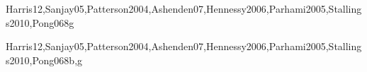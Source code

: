 \begin{syllabus}
\begin{unit}{\ARMachinelevelrepresentationofdata}{}{Harris12,Sanjay05,Patterson2004,Ashenden07,Hennessy2006,Parhami2005,Stallings2010,Pong06}{8}{g}
\begin{learningoutcomes}
\item \ARMachinelevelrepresentationofdataLOExplainWhyData [\Assessment]
\item \ARMachinelevelrepresentationofdataLOExplainTheUsing [\Familiarity]
\item \ARMachinelevelrepresentationofdataLODescribeHowAre [\Usage]
\item \ARMachinelevelrepresentationofdataLOExplainHowNumber [\Usage]
\item \ARMachinelevelrepresentationofdataLODescribeTheOf [\Usage]
\item \ARMachinelevelrepresentationofdataLOConvertNumerical [\Usage]
\end{learningoutcomes}
\end{unit}

\begin{unit}{\ARAssemblylevelmachineorganization}{}{Harris12,Sanjay05,Patterson2004,Ashenden07,Hennessy2006,Parhami2005,Stallings2010,Pong06}{8}{b,g}
\begin{topics}
  \item \ARAssemblylevelmachineorganizationTopicBasic
  \item \ARAssemblylevelmachineorganizationTopicControl
  \item \ARAssemblylevelmachineorganizationTopicInstruction
  \item \ARAssemblylevelmachineorganizationTopicAssembly
  \item \ARAssemblylevelmachineorganizationTopicInstructionFormats
  \item \ARAssemblylevelmachineorganizationTopicAddressing
  \item \ARAssemblylevelmachineorganizationTopicSubroutine
  \item \ARAssemblylevelmachineorganizationTopicI
  \item \ARAssemblylevelmachineorganizationTopicHeap
\end{topics}


\end{unit}
\end{syllabus}
